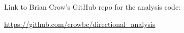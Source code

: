 Link to Brian Crow's GitHub repo for the analysis code:

\url{https://github.com/crowbc/directional_analysis}